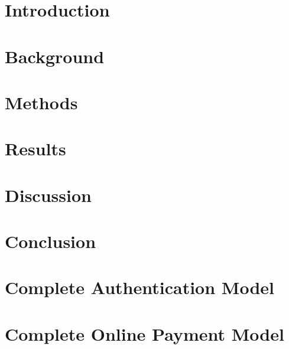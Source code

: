 \documentclass[12pt,letterpaper]{report}
\begin{document}
\renewcommand{\contentsname}{Table of Contents}
\tableofcontents
\listoffigures
\listoftables

\clearpage
{}

\chapter{Introduction}


\chapter{Background}


\chapter{Methods}


\chapter{Results}


\chapter{Discussion}


\chapter{Conclusion}


\begin{appendices}

\chapter{Complete Authentication Model}


\chapter{Complete Online Payment Model}


\end{appendices}

\renewcommand\bibname{References}
\printbibliography[heading=bibintoc]
\end{document}
